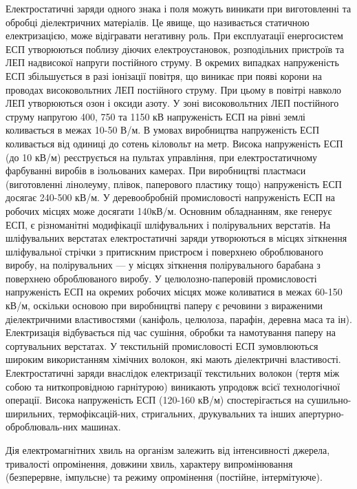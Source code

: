\documentclass[14pt]{extarticle} %
\begin{document}
Електростатичні заряди одного знака і поля можуть виникати при виготовленні та
обробці діелектричних матеріалів. Це явище, що називається статичною
електризацією, може відігравати негативну роль.
При експлуатації енергосистем ЕСП утворюються поблизу діючих електроустановок,
розподільних пристроїв та ЛЕП надвисокої напруги постійного струму. В окремих
випадках напруженість ЕСП збільшується в разі іонізації повітря, що виникає при
появі корони на проводах високовольтних ЛЕП постійного струму. При цьому в
повітрі навколо ЛЕП утворюються озон і оксиди азоту.
У зоні високовольтних ЛЕП постійного струму напругою 400, 750 та 1150 кВ
напруженість ЕСП на рівні землі коливається в межах 10-50 В/м. В умовах
виробництва напруженість ЕСП коливається від одиниці до сотень кіловольт на
метр. Висока напруженість ЕСП (до 10 кВ/м) реєструється на пультах управління,
при електростатичному фарбуванні виробів в ізольованих камерах.
При виробництві пластмаси (виготовленні лінолеуму, плівок, паперового пластику
тощо) напруженість ЕСП досягає 240-500 кВ/м. У деревообробній промисловості
напруженість ЕСП на робочих місцях може досягати 140кВ/м. Основним обладнанням,
яке генерує ЕСП, є різноманітні модифікації шліфувальних і полірувальних
верстатів. На шліфувальних верстатах електростатичні заряди утворюються в
місцях зіткнення шліфувальної стрічки з притискним пристроєм і поверхнею
оброблюваного виробу, на полірувальних — у місцях зіткнення полірувального
барабана з поверхнею оброблюваного виробу.
У целюлозно-паперовій промисловості напруженість ЕСП на окремих робочих місцях
може коливатися в межах 60-150 кВ/м, оскільки основою при виробництві паперу є
речовини з вираженими діелектричними властивостями (каніфоль, целюлоза,
парафін, деревна
маса та ін). Електризація відбувається під час сушіння, обробки та намотування
паперу на сортувальних верстатах.
У текстильній промисловості ЕСП зумовлюються широким використанням хімічних
волокон, які мають діелектричні властивості. Електростатичні заряди внаслідок
електризації текстильних волокон (тертя між собою та ниткопровідною гарнітурою)
виникають упродовж всієї технологічної операції. Висока напруженість ЕСП
(120-160 кВ/м) спостерігається на сушильно-ширильних, термофіксацій-них,
стригальних, друкувальних та інших апертурно-оброблюваль-них машинах.

Дія електромагнітних хвиль на організм залежить від інтенсивності джерела,
тривалості опромінення, довжини хвиль, характеру випромінювання (безперервне,
імпульсне) та режиму опромінення (постійне, інтермітуюче).
\end{document}

